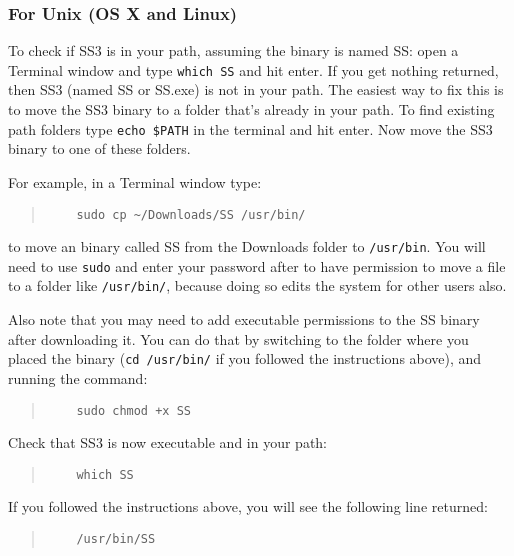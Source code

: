 \subsubsection{For Unix (OS X and Linux)}

To check if SS3 is in your path, assuming the binary is named SS: open a Terminal window and type \texttt{which SS} and hit enter. If you get nothing returned, then SS3 (named SS or SS.exe) is not in your path. The easiest way to fix this is to move the SS3 binary to a folder that's already in your path. To find existing path folders type \texttt{echo \$PATH} in the terminal and hit enter. Now move the SS3 binary to one of these folders.

For example, in a Terminal window type:

\begin{quote}
   \begin{verbatim}
    sudo cp ~/Downloads/SS /usr/bin/
  \end{verbatim}
\end{quote}

to move an binary called SS from the Downloads folder to \texttt{/usr/bin}. You will need to use \texttt{sudo} and enter your password after to have permission to move a file to a folder like \texttt{/usr/bin/}, because doing so edits the system for other users also.

Also note that you may need to add executable permissions to the SS binary after downloading it. You can do that by switching to the folder where you placed the binary
(\texttt{cd /usr/bin/} if you followed the instructions above), and running the command:

\begin{quote}
   \begin{verbatim}
    sudo chmod +x SS
    \end{verbatim}
\end{quote}

Check that SS3 is now executable and in your path:

\begin{quote}
   \begin{verbatim}
    which SS
    \end{verbatim}
\end{quote}

If you followed the instructions above, you will see the following line returned:

\begin{quote}
   \begin{verbatim}
    /usr/bin/SS
  \end{verbatim}
\end{quote}

